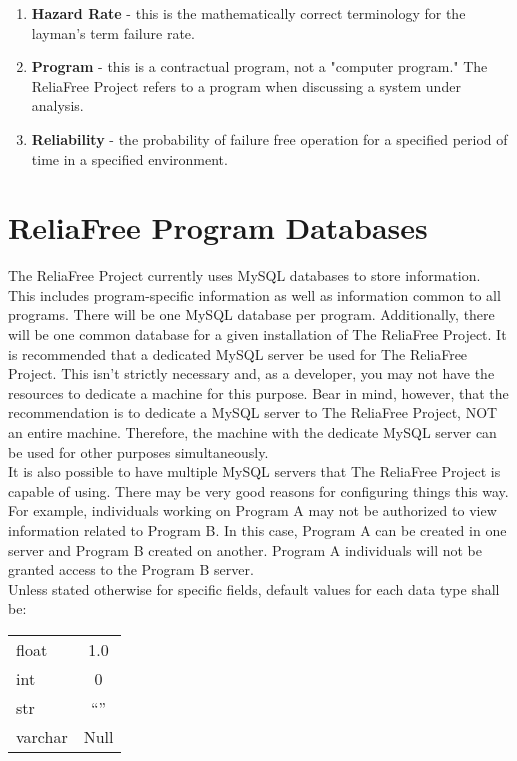 \documentclass[11pt, 12pt, twoside, onecolumn]{article}
\begin{document}
\begin{enumerate}
	\item \textbf{Hazard Rate} - this is the mathematically correct terminology for the layman's term failure rate.
	\item \textbf{Program} - this is a contractual program, not a "computer program."  The ReliaFree Project refers to a program when discussing a system under analysis.
	\item \textbf{Reliability} - the probability of failure free operation for a specified period of time in a specified environment.
\end{enumerate}

\section{\bf \Large ReliaFree Program Databases}

\noindent The ReliaFree Project currently uses MySQL databases to store information.  This includes program-specific information as well as information common to all programs.  There will be one MySQL database per program.  Additionally, there will be one common database for a given installation of The ReliaFree Project.  It is recommended that a dedicated MySQL server be used for The ReliaFree Project.  This isn't strictly necessary and, as a developer, you may not have the resources to dedicate a machine for this purpose.  Bear in mind, however, that the recommendation is to dedicate a MySQL server to The ReliaFree Project, NOT an entire machine.  Therefore, the machine with the dedicate MySQL server can be used for other purposes simultaneously. \\

\noindent It is also possible to have multiple MySQL servers that The ReliaFree Project is capable of using.  There may be very good reasons for configuring things this way.  For example, individuals working on Program A may not be authorized to view information related to Program B.  In this case, Program A can be created in one server and Program B created on another.  Program A individuals will not be granted access to the Program B server. \\

\noindent Unless stated otherwise for specific fields, default values for each data type shall be:

\bigskip
\begin{tabular}{l c}
float & 1.0 \\
int & 0 \\
str & ``'' \\
varchar & Null \\
\end{tabular}
\bigskip
\end{document}
